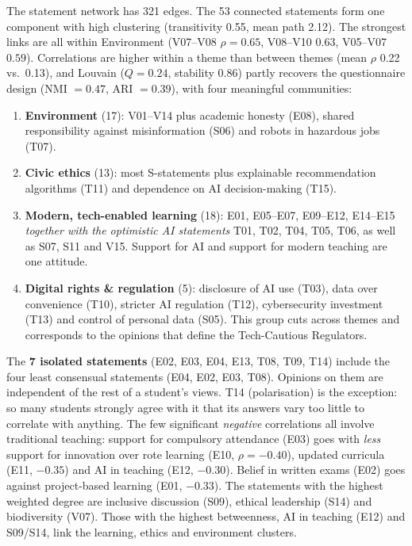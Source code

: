 \documentclass[11pt,a4paper]{article}
\begin{document}
The statement network has 321 edges. The 53 connected statements form one component with high clustering
(transitivity 0.55, mean path 2.12). The strongest links are all within Environment (V07--V08 $\rho=0.65$, V08--V10 $0.63$,
V05--V07 $0.59$). Correlations are higher within a theme than between themes (mean $\rho$ 0.22 vs.\ 0.13), and Louvain
($Q=0.24$, stability 0.86) partly recovers the questionnaire design (NMI $=0.47$, ARI $=0.39$), with four meaningful communities:
\begin{enumerate}
\item \textbf{Environment} (17): V01--V14 plus academic honesty (E08), shared responsibility against misinformation (S06) and robots in hazardous jobs (T07).
\item \textbf{Civic ethics} (13): most S-statements plus explainable recommendation algorithms (T11) and dependence on AI decision-making (T15).
\item \textbf{Modern, tech-enabled learning} (18): E01, E05--E07, E09--E12, E14--E15 \emph{together with the optimistic AI
statements} T01, T02, T04, T05, T06, as well as S07, S11 and V15. Support for AI and support for modern teaching are one attitude.
\item \textbf{Digital rights \& regulation} (5): disclosure of AI use (T03), data over convenience (T10), stricter AI regulation (T12),
cybersecurity investment (T13) and control of personal data (S05). This group cuts across themes and corresponds to the
opinions that define the Tech-Cautious Regulators.
\end{enumerate}
The \textbf{7 isolated statements} (E02, E03, E04, E13, T08, T09, T14) include the four least consensual statements
(E04, E02, E03, T08). Opinions on them are independent of the rest of a student's views. T14 (polarisation) is the
exception: so many students strongly agree with it that its answers vary too little to correlate with anything. The few significant \emph{negative}
correlations all involve traditional teaching: support for compulsory attendance (E03) goes with \emph{less} support for innovation over rote
learning (E10, $\rho=-0.40$), updated curricula (E11, $-0.35$) and AI in teaching (E12, $-0.30$). Belief in written exams
(E02) goes against project-based learning (E01, $-0.33$). The statements with the highest weighted degree are
inclusive discussion (S09), ethical leadership (S14) and biodiversity (V07). Those with the highest betweenness,
AI in teaching (E12) and S09/S14, link the learning, ethics and environment clusters.
\end{document}
